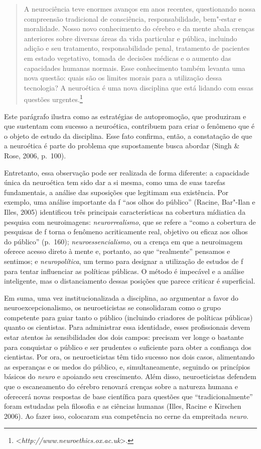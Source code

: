 \begin{quote}
A neurociência teve enormes avanços em anos recentes, questionando nossa
compreensão tradicional de consciência, responsabilidade, bem"-estar e
moralidade. Nosso novo conhecimento do cérebro e da mente abala crenças
anteriores sobre diversas áreas da vida particular e pública, incluindo
adição e seu tratamento, responsabilidade penal, tratamento de pacientes
em estado vegetativo, tomada de decisões médicas e o aumento das
capacidades humanas normais. Esse conhecimento também levanta uma nova
questão: quais são os limites morais para a utilização dessa tecnologia?
A neuroética é uma nova disciplina que está lidando com essas questões
urgentes.\footnote[5]{\textless{}\emph{http://www.neuroethics.ox.ac.uk}\textgreater{}.}
\end{quote}

Este parágrafo ilustra como as estratégias de autopromoção, que
produziram e que sustentam com sucesso a neuroética, contribuem para
criar o fenômeno que é o objeto de estudo da disciplina. Esse fato
confirma, então, a constatação de que a neuroética é parte do problema
que supostamente busca abordar (Singh \& Rose, 2006, p.~100).

Entretanto, essa observação pode ser realizada de forma diferente: a
capacidade única da neuroética tem sido dar a si mesma, como uma de suas
tarefas fundamentais, a análise das suposições que legitimam sua
existência. Por exemplo, uma análise importante da f ``aos olhos do
público'' (Racine, Bar"-Ilan e Illes, 2005) identificou três principais
características na cobertura mídiatica da pesquisa com neuroimagens:
\emph{neurorrealismo}, que se refere a ``como a cobertura de pesquisas
de f torna o fenômeno acriticamente real, objetivo ou eficaz aos
olhos do público'' (p.~160); \emph{neuroessencialismo}, ou a crença em
que a neuroimagem oferece acesso direto à mente e, portanto, ao que
``realmente'' pensamos e sentimos; e \emph{neuropolítica}, um termo para
designar a utilização de estudos de f para tentar influenciar as
políticas públicas. O método é impecável e a análise inteligente, mas o
distanciamento dessas posições que parece criticar é superficial.

Em suma, uma vez institucionalizada a disciplina, ao argumentar a favor
do neuroexcepcionalismo, os neuroeticistas se consolidaram como o grupo
competente para guiar tanto o público (incluindo criadores de políticas
públicas) quanto os cientistas. Para administrar essa identidade, esses
profissionais devem estar atentos às sensibilidades dos dois campos:
precisam ver longe o bastante para conquistar o público e ser prudentes
o suficiente para obter a confiança dos cientistas. Por ora, os
neuroeticistas têm tido sucesso nos dois casos, alimentando as
esperanças e os medos do público, e, simultaneamente, seguindo os
princípios básicos do \emph{neuro} e apoiando seu crescimento. Além
disso, neuroeticistas defendem que o escaneamento do cérebro renovará
crenças sobre a natureza humana e oferecerá novas respostas de base
científica para questões que ``tradicionalmente'' foram estudadas pela
filosofia e as ciências humanas (Illes, Racine e Kirschen 2006). Ao
fazer isso, colocaram sua competência no cerne da empreitada
\emph{neuro}.

